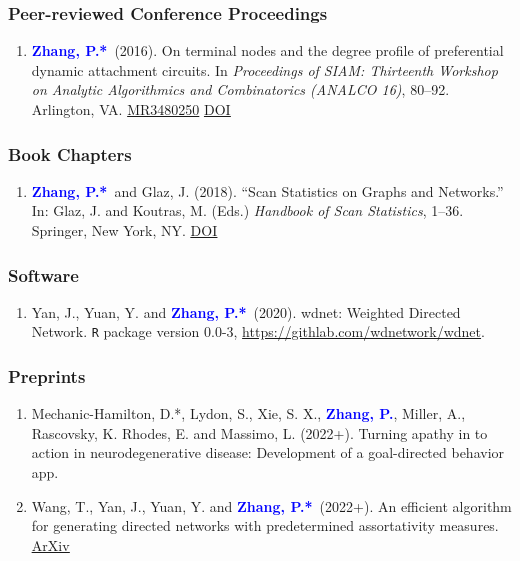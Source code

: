 \documentclass{res}
\def\MR#1{\href{http://www.ams.org/mathscinet-getitem?mr=#1}{MR#1}}
\newcommand{\PZ}{\textbf{\textcolor{blue}{Zhang, P.*}}}
\newcommand{\PZnot}{\textbf{\textcolor{blue}{Zhang, P.}}}
\begin{document}
\begin{resume}
\subsubsection{Peer-reviewed Conference Proceedings}
\begin{enumerate}
	\item \PZ\ (2016). On terminal nodes and the degree 
	profile of preferential dynamic attachment circuits. In 
	\emph{Proceedings of SIAM: Thirteenth Workshop on Analytic 
	Algorithmics and Combinatorics (ANALCO 16)}, 80--92. Arlington, 
	VA. \MR{3480250}
	\href{https://doi.org/10.1137/1.9781611974324.9}
	{\underline{DOI}}	
\end{enumerate}

\subsubsection{Book Chapters}
\begin{enumerate}
	\item \PZ\ and {\sc Glaz, J.} (2018). ``Scan 
	Statistics on Graphs and Networks.'' In: Glaz, J. and Koutras, 
	M. (Eds.) {\em Handbook of Scan Statistics}, 1--36. Springer, 
	New York, NY. 
	\href{https://doi.org/10.1007/978-1-4614-8414-1_43-1}
	{\underline{DOI}}	
\end{enumerate}

\subsubsection{Software}
\begin{enumerate}
	\item {\sc Yan, J., Yuan, Y.} and \PZ\ (2020). 
	wdnet: Weighted Directed Network. {\tt R} package version 0.0-3, 
	\url{https://githlab.com/wdnetwork/wdnet}.
\end{enumerate}

\subsubsection{Preprints}
\begin{enumerate}
	\item {\sc Mechanic-Hamilton, D.*, Lydon, S., Xie, S. X.,} 
	\PZnot, {\sc Miller, A., Rascovsky, K. Rhodes, E.} and {\sc 
	Massimo, L.} (2022+). Turning apathy in to action in 
	neurodegenerative disease: Development of a goal-directed 
	behavior app.
	
	\item {\sc Wang, T., Yan, J., Yuan, Y.} and \PZ\ (2022+). An 
	efficient algorithm for generating directed networks with 
	predetermined assortativity measures. 
	\href{https://arxiv.org/pdf/2201.03451.pdf}{\underline{ArXiv}}
	

\end{enumerate}
\end{resume}
\end{document}
